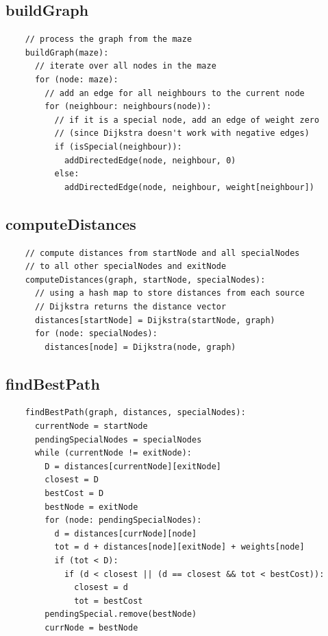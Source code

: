 \documentclass[12pt]{report}
\begin{document}
\subsection{buildGraph}
\begin{tcolorbox}
\begin{verbatim}
    // process the graph from the maze
    buildGraph(maze):
      // iterate over all nodes in the maze
      for (node: maze):
        // add an edge for all neighbours to the current node
        for (neighbour: neighbours(node)):
          // if it is a special node, add an edge of weight zero
          // (since Dijkstra doesn't work with negative edges)
          if (isSpecial(neighbour)):
            addDirectedEdge(node, neighbour, 0)
          else:
            addDirectedEdge(node, neighbour, weight[neighbour])
\end{verbatim}
\end{tcolorbox}

\subsection{computeDistances}
\begin{tcolorbox}
\begin{verbatim}
    // compute distances from startNode and all specialNodes
    // to all other specialNodes and exitNode
    computeDistances(graph, startNode, specialNodes):
      // using a hash map to store distances from each source
      // Dijkstra returns the distance vector
      distances[startNode] = Dijkstra(startNode, graph)
      for (node: specialNodes):
        distances[node] = Dijkstra(node, graph)
\end{verbatim}
\end{tcolorbox}

\subsection{findBestPath}
\begin{tcolorbox}
\begin{verbatim}
    findBestPath(graph, distances, specialNodes):
      currentNode = startNode
      pendingSpecialNodes = specialNodes
      while (currentNode != exitNode):
        D = distances[currentNode][exitNode]
        closest = D
        bestCost = D
        bestNode = exitNode
        for (node: pendingSpecialNodes):
          d = distances[currNode][node]
          tot = d + distances[node][exitNode] + weights[node]
          if (tot < D):
            if (d < closest || (d == closest && tot < bestCost)):
              closest = d
              tot = bestCost
        pendingSpecial.remove(bestNode)
        currNode = bestNode
\end{verbatim}
\end{tcolorbox}
\end{document}
